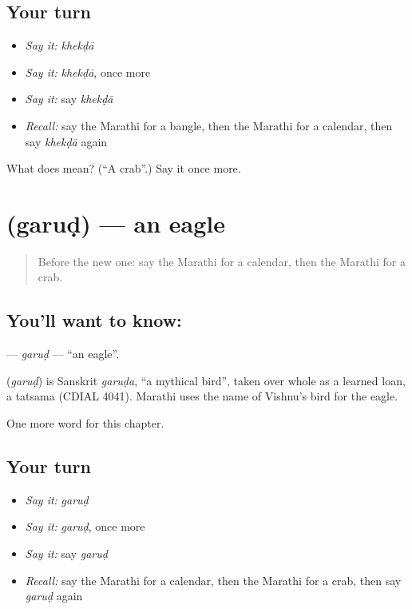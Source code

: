 \subsection*{Your turn}
\begin{itemize}
\raggedright
  \item \emph{Say it:} \emph{khekḍā}
  \item \emph{Say it:} \emph{khekḍā}, once more
  \item \emph{Say it:} say \emph{khekḍā}
  \item \emph{Recall:} say the Marathi for a bangle, then the Marathi for a calendar, then say \emph{khekḍā} again
\end{itemize}

\begin{tcolorbox}[breakable,colback=teal!4,colframe=teal!35!black,title={Before you move on}]
What does  mean? (\textquotedblleft{}A crab\textquotedblright{}.) Say it once more.
\end{tcolorbox}
\section[\texorpdfstring{\mr{गरुड} (garuḍ)}{गरुड (garuḍ)}]{ (garuḍ) — an eagle}

\label{lesson:MR-C188-garud}



\begin{quote}
Before the new one: say the Marathi for a calendar, then the Marathi for a crab.
\end{quote}

\subsection*{You'll want to know: }
\textbf{} — \emph{garuḍ} — \textquotedblleft{}an eagle\textquotedblright{}.

\begin{cousinweb}
\textbf{} (\emph{garuḍ}) is Sanskrit \emph{garuḍa}, \textquotedblleft{}a mythical bird\textquotedblright{}, taken over whole as a learned loan, a tatsama (CDIAL 4041). Marathi uses the name of Vishnu's bird for the eagle.
\end{cousinweb}

\begin{grammarlens}[title={What you've built}]
One more word for this chapter.
\end{grammarlens}

\subsection*{Your turn}
\begin{itemize}
\raggedright
  \item \emph{Say it:} \emph{garuḍ}
  \item \emph{Say it:} \emph{garuḍ}, once more
  \item \emph{Say it:} say \emph{garuḍ}
  \item \emph{Recall:} say the Marathi for a calendar, then the Marathi for a crab, then say \emph{garuḍ} again
\end{itemize}

